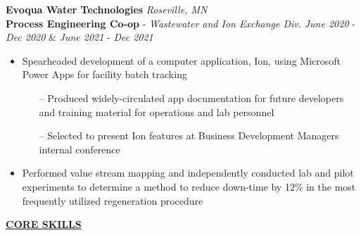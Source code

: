 \documentclass{article}
\begin{document}
\noindent \textbf{Evoqua Water Technologies} \hfill \textit{Roseville, MN} \\
\textbf{Process Engineering Co-op} - \textit{Wastewater and Ion Exchange Div.} \hfill \textit{June 2020} - \textit{Dec 2020} \& \textit{June 2021} - \textit{Dec 2021}
\renewcommand{\labelitemii}{$\bullet$}
\begin{itemize}[noitemsep,nolistsep]
\item {Spearheaded development of a computer application, Ion, using Microsoft Power Apps for facility batch tracking}
\begin{itemize}[noitemsep,nolistsep]
\item[--]{Produced widely-circulated app documentation for future developers and training material for operations and lab personnel}
\item[--]{Selected to present Ion features at Business Development Managers internal conference}
\end{itemize}
\item {Performed value stream mapping and independently conducted lab and pilot experiments to determine a method to reduce down-time by 12\% in the most frequently utilized regeneration procedure}\\
\end{itemize}

\vspace{-4 pt} %

\noindent \textbf{\large\underline{CORE SKILLS}} \\
\begin{comment}
    TOP SKILLS: Embedded linux (intermediate), MATLAB (intermediate), Simulink, Agile Project Management, Git, Python, LabVIEW, Java, Minitab, multi-factor DOE,  Microsoft Office (Excel, Visio, Word, PowerPoint), Microsoft Power BI, Verification \& Validation, \LaTeX
    Aspen Plus, OOP, code documentation, multi-factor DOE, parametric and non-parametric stats
\end{comment}
\vspace{-10 pt} %
\end{document}
